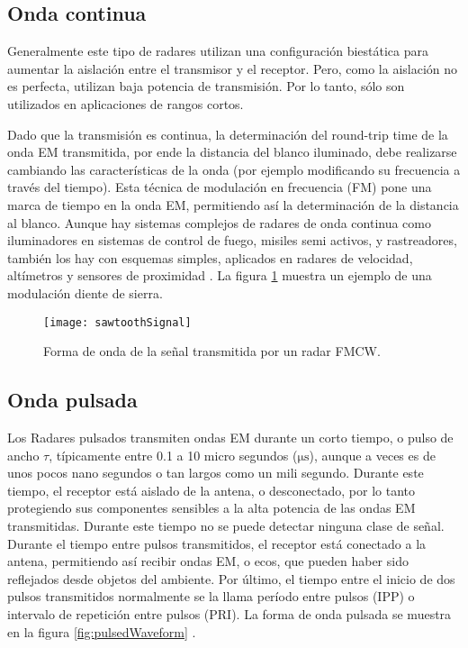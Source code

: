 \subsection{Onda continua}

Generalmente este tipo de radares utilizan una configuración biestática para aumentar la aislación entre el transmisor y el receptor. Pero, como la aislación no es perfecta, utilizan baja potencia de transmisión. Por lo tanto, sólo son utilizados en aplicaciones de rangos cortos.

Dado que la transmisión es continua, la determinación del round-trip time de la onda EM transmitida, por ende la distancia del blanco iluminado, debe realizarse cambiando las características de la onda (por ejemplo modificando su frecuencia a través del tiempo). Esta técnica de modulación en frecuencia (FM) pone una marca de tiempo en la onda EM, permitiendo así la determinación de la distancia al blanco. Aunque hay sistemas complejos de radares de onda continua como iluminadores en sistemas de control de fuego, misiles semi activos, y rastreadores, también los hay con esquemas simples, aplicados en radares de velocidad, altímetros y sensores de proximidad \cite{Richards2010}. La figura \ref{fig:continuousWaveform} muestra un ejemplo de una modulación diente de sierra.

\begin{figure}
 \centering
 \texttt{[image: sawtoothSignal]}
 \caption{Forma de onda de la señal transmitida por un radar FMCW.}
 \label{fig:continuousWaveform}
\end{figure}


\subsection{Onda pulsada}

Los Radares pulsados transmiten ondas EM durante un corto tiempo, o pulso de ancho $\tau$, típicamente entre 0.1 a 10 micro segundos ($\si{\us}$), aunque a veces es de unos pocos nano segundos o tan largos como un mili segundo. Durante este tiempo, el receptor está aislado de la antena, o desconectado, por lo tanto protegiendo sus componentes sensibles a la alta potencia de las ondas EM transmitidas. Durante este tiempo no se puede detectar ninguna clase de señal. Durante el tiempo entre pulsos transmitidos, el receptor está conectado a la antena, permitiendo así recibir ondas EM, o ecos, que pueden haber sido reflejados desde objetos del ambiente. Por último, el tiempo entre el inicio de dos pulsos transmitidos normalmente se la llama período entre pulsos (IPP) o intervalo de repetición entre pulsos (PRI). La forma de onda pulsada se muestra en la figura \ref{fig:pulsedWaveform} \cite{Richards2010}.

